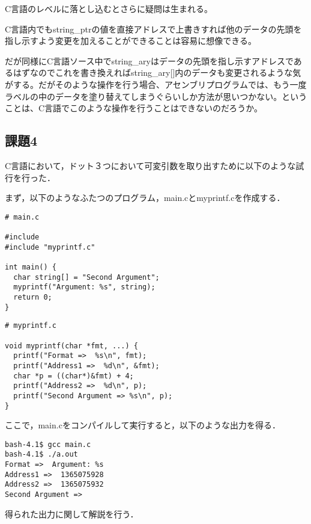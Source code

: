 \documentclass[a4j]{jarticle}
\begin{document}
C言語のレベルに落とし込むとさらに疑問は生まれる。

C言語内でもstring\_ptrの値を直接アドレスで上書きすれば他のデータの先頭を指し示すよう変更を加えることができることは容易に想像できる。

だが同様にC言語ソース中でstring\_aryはデータの先頭を指し示すアドレスであるはずなのでこれを書き換えればstring\_ary[]内のデータも変更されるような気がする。だがそのような操作を行う場合、アセンブリプログラムでは、もう一度ラベルの中のデータを塗り替えてしまうぐらいしか方法が思いつかない。ということは、C言語でこのような操作を行うことはできないのだろうか。

\subsection{課題4}


C言語において，ドット３つにおいて可変引数を取り出すために以下のような試行を行った．

まず，以下のようなふたつのプログラム，main.cとmyprintf.cを作成する．

\begin{verbatim}
# main.c

#include
#include "myprintf.c"
 
int main() {
  char string[] = "Second Argument";
  myprintf("Argument: %s", string);
  return 0;
}
\end{verbatim}

\begin{verbatim}
# myprintf.c

void myprintf(char *fmt, ...) {
  printf("Format =>  %s\n", fmt);
  printf("Address1 =>  %d\n", &fmt);
  char *p = ((char*)&fmt) + 4;
  printf("Address2 =>  %d\n", p);
  printf("Second Argument => %s\n", p);
}

\end{verbatim}

ここで，main.cをコンパイルして実行すると，以下のような出力を得る．

\begin{verbatim}
bash-4.1$ gcc main.c 
bash-4.1$ ./a.out 
Format =>  Argument: %s
Address1 =>  1365075928
Address2 =>  1365075932
Second Argument => 
\end{verbatim}

得られた出力に関して解説を行う．
\end{document}
